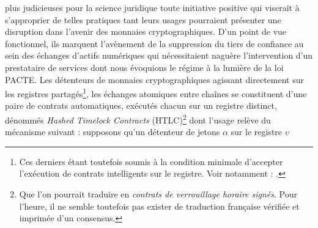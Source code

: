 {plus judicieuses pour la science juridique toute initiative positive qui viserait à s'approprier de telles pratiques tant leurs usages pourraient présenter une disruption dans l'avenir des monnaies cryptographiques. D'un point de vue fonctionnel, ils marquent l'avènement de la suppression du tiers de confiance au sein des échanges d'actifs numériques qui nécessitaient naguère l'intervention d'un prestataire de services dont nous évoquions le régime à la lumière de la loi PACTE. Les détenteurs de monnaies cryptographiques agissant directement sur les registres partagés\footnote{Ces derniers étant toutefois soumis à la condition minimale d'accepter l'exécution de contrats intelligents sur le registre. Voir notamment : .}, les échanges atomiques entre chaînes se constituent d'une paire de contrats automatiques, exécutés chacun sur un registre distinct, dénommés \emph{Hashed Timelock Contracts} (\acrshort{HTLC})\footnote{Que l'on pourrait traduire en \emph{contrats de verrouillage horaire signés}. Pour l'heure, il ne semble toutefois pas exister de traduction française vérifiée et imprimée d'un consensus.} dont l'usage relève du mécanisme suivant : supposons qu'un détenteur de jetons $\alpha$ sur le registre $\upsilon$
}
